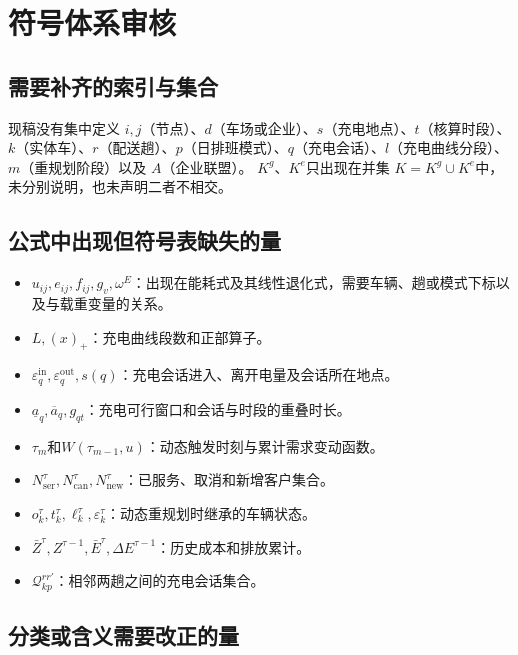 \documentclass[UTF8,11pt,a4paper,fontset=none]{ctexart}
\begin{document}
\section{符号体系审核}

\subsection{需要补齐的索引与集合}

现稿没有集中定义 $i,j$（节点）、$d$（车场或企业）、$s$（充电地点）、$t$（核算时段）、
$k$（实体车）、$r$（配送趟）、$p$（日排班模式）、$q$（充电会话）、$l$（充电曲线分段）、
$m$（重规划阶段）以及 $A$（企业联盟）。
$K^g$、$K^e$只出现在并集 $K=K^g\cup K^e$中，未分别说明，也未声明二者不相交。

\subsection{公式中出现但符号表缺失的量}

\begin{itemize}
  \item $u_{ij},e_{ij},f_{ij},g_v,\omega^E$：出现在能耗式及其线性退化式，需要车辆、趟或模式下标以及与载重变量的关系。
  \item $L,(x)_+$：充电曲线段数和正部算子。
  \item $\varepsilon_q^{\mathrm{in}},\varepsilon_q^{\mathrm{out}},s(q)$：充电会话进入、离开电量及会话所在地点。
  \item $\underline a_q,\overline a_q,g_{qt}$：充电可行窗口和会话与时段的重叠时长。
  \item $\tau_m$和$W(\tau_{m-1},u)$：动态触发时刻与累计需求变动函数。
  \item $N_{\mathrm{ser}}^\tau,N_{\mathrm{can}}^\tau,N_{\mathrm{new}}^\tau$：已服务、取消和新增客户集合。
  \item $o_k^\tau,t_k^\tau,\ell_k^\tau,\varepsilon_k^\tau$：动态重规划时继承的车辆状态。
  \item $\bar Z^\tau,Z^{\tau-1},\bar E^\tau,\Delta E^{\tau-1}$：历史成本和排放累计。
  \item $\mathcal Q_{kp}^{rr'}$：相邻两趟之间的充电会话集合。
\end{itemize}

\subsection{分类或含义需要改正的量}
\end{document}
